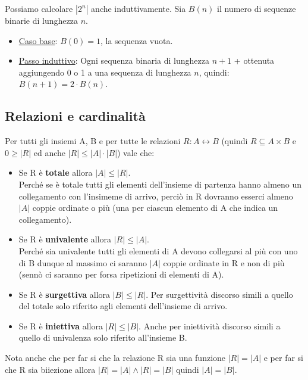 \hspace{-15pt}Possiamo calcolare $|2^n|$ anche induttivamente. Sia $B(n)$ il numero di sequenze binarie di lunghezza $n$.
\begin{itemize}
    \item \underline{Caso base}: $B(0) = 1$, la sequenza vuota.
    \item \underline{Passo induttivo}: Ogni sequenza binaria di lunghezza $n+1$ + ottenuta aggiungendo 0 o 1 a una sequenza di lunghezza $n$, quindi: $B(n+1) = 2 \cdot B(n)$.
\end{itemize}

\newpage
\subsection{Relazioni e cardinalità}
\begin{proposition}\label{prop-rel-card-1}
Per tutti gli insiemi A, B e per tutte le relazioni $R: A \leftrightarrow B$ (quindi $R\subseteq A \times B$ e $0\geq |R|$ ed anche $|R| \leq |A| \cdot |B|$) vale che:
\begin{itemize}
    \item Se R è \textbf{totale} allora $|A|\leq |R|$.\\
    Perché se è totale tutti gli elementi dell'insieme di partenza hanno almeno un collegamento con l'insimeme di arrivo, perciò in R dovranno esserci almeno $|A|$ coppie ordinate o più (una per ciascun elemento di A che indica un collegamento).
    \item Se R è \textbf{univalente} allora $|R|\leq |A|$.\\
    Perché sia univalente tutti gli elementi di A devono collegarsi al più con uno di B dunque al massimo ci saranno $|A|$ coppie ordinate in R e non di più (sennò ci saranno per forsa ripetizioni di elementi di A).
    \item Se R è \textbf{surgettiva} allora $|B|\leq |R|$.
    Per surgettività discorso simili a quello del totale solo riferito agli elementi dell'insieme di arrivo.
    \item Se R è \textbf{iniettiva} allora $|R|\leq |B|$.
    Anche per iniettività discorso simili a quello di univalenza solo riferito all'insieme B.
\end{itemize}
\end{proposition}

\begin{note}\label{nota-1}
Nota anche che per far si che la relazione R sia una funzione $|R| = |A|$ e per far si che R sia biiezione allora $|R| = |A| \land |R| = |B|$ quindi $|A| = |B|$.
\end{note}

